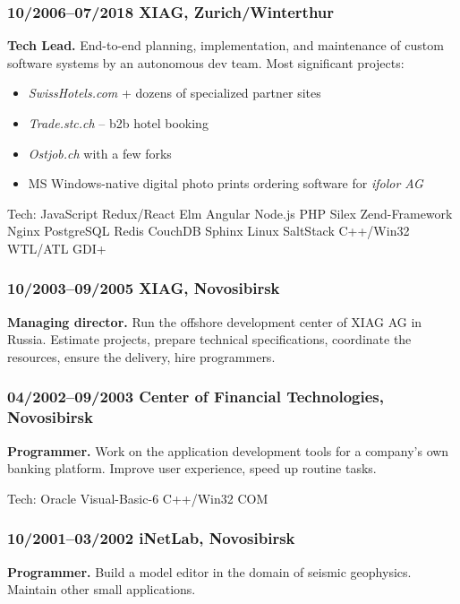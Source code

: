 \documentclass[a4paper, twocolumn, 10pt]{article}
\begin{document}
\subsubsection*{10/2006--07/2018 XIAG, Zurich/Winterthur}

\textbf{Tech Lead.} End-to-end planning, implementation, and maintenance of custom
software systems by an autonomous dev team. Most significant projects:

\begin{itemize}
  \itemsep0em
  \item \emph{SwissHotels.com} + dozens of specialized partner sites
  \item \emph{Trade.stc.ch} -- b2b hotel booking
  \item \emph{Ostjob.ch} with a few forks
  \item MS Windows-native digital photo prints ordering software for \emph{ifolor AG}
\end{itemize}

Tech: JavaScript Redux/React Elm Angular Node.js PHP Silex Zend-Framework Nginx PostgreSQL
Redis CouchDB Sphinx Linux SaltStack C++/Win32 WTL/ATL GDI+

\subsubsection*{10/2003--09/2005 XIAG, Novosibirsk}

\textbf{Managing director.} Run the offshore development center of XIAG AG in
Russia. Estimate projects, prepare technical specifications, coordinate the resources, ensure the
delivery, hire programmers.

\subsubsection*{04/2002--09/2003 Center of Financial Technologies, Novosibirsk}

\textbf{Programmer.} Work on the application development tools for a company's own banking
platform. Improve user experience, speed up routine tasks.

Tech: Oracle Visual-Basic-6 C++/Win32 COM

\subsubsection*{10/2001--03/2002 iNetLab, Novosibirsk}

\textbf{Programmer.} Build a model editor in the domain of seismic geophysics. Maintain other small
applications.
\end{document}
